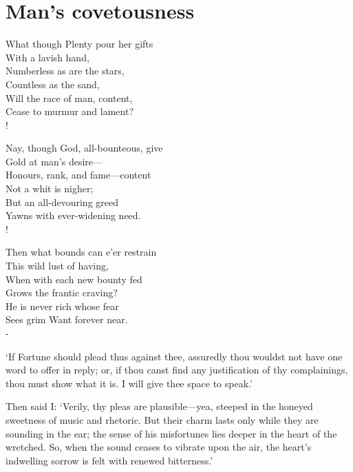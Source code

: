 \documentclass[12pt]{book}
\newenvironment{ipoem}[1]%
  {\setcounter{poemindentevery}{#1}\begin{poem}\small}%
  {\end{poem}\setcounter{poemindentevery}{0}}
\begin{document}

\section{Man's covetousness}

\begin{ipoem}{2}
    What though Plenty pour her gifts \\
      With a lavish hand, \\
    Numberless as are the stars, \\
      Countless as the sand, \\
    Will the race of man, content, \\
    Cease to murmur and lament? \\!
 
    Nay, though God, all-bounteous, give \\
      Gold at man's desire--- \\
    Honours, rank, and fame---content \\
      Not a whit is nigher; \\
    But an all-devouring greed \\
    Yawns with ever-widening need. \\!

    Then what bounds can e'er restrain \\
      This wild lust of having, \\
    When with each new bounty fed \\
      Grows the frantic craving? \\
    He is never rich whose fear \\
    Sees grim Want forever near. \\-
\end{ipoem}


`If Fortune should plead thus against thee, assuredly thou wouldst not
have one word to offer in reply; or, if thou canst find any
justification of thy complainings, thou must show what it is. I will
give thee space to speak.'

Then said I: `Verily, thy pleas are plausible---yea, steeped in the
honeyed sweetness of music and rhetoric. But their charm lasts only
while they are sounding in the ear; the sense of his misfortunes lies
deeper in the heart of the wretched. So, when the sound ceases to
vibrate upon the air, the heart's indwelling sorrow is felt with renewed
bitterness.'
\end{document}
